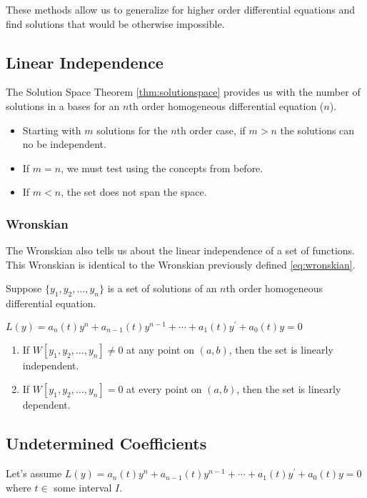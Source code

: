 \documentclass[12pt,landscape,twocolumn]{article}
\begin{document}
    These methods allow us to generalize for higher order differential equations and find solutions that would be otherwise impossible.

    \subsection{Linear Independence}
    The Solution Space Theorem \eqref{thm:solutionspace} provides us with the number of solutions in a bases for an $n$th order homogeneous differential equation ($n$).

    \begin{itemize}
        \item Starting with $m$ solutions for the $n$th order case, if $m > n$ the solutions can no be independent.
        \item If $m=n$, we must test using the concepts from before.
        \item If $m < n$, the set does not span the space.
    \end{itemize}

        \subsubsection{Wronskian}
        The Wronskian also tells us about the linear independence of a set of functions. This Wronskian is identical to the Wronskian previously defined \eqref{eq:wronskian}.

        Suppose $\{y_1, y_2, \dots, y_n \}$ is a set of solutions of an $n$th order homogeneous differential equation.

            $
                L(y) = a_n(t)y^n + a_{n-1}(t)y^{n-1} + \cdots + a_1 (t)y^\prime + a_0 (t)y = 0
            $
            \begin{enumerate}
                \item If $W[y_1, y_2, \dots, y_n] \neq 0$ at any point on $(a, b)$, then the set is linearly independent.
                \item If $W[y_1, y_2, \dots, y_n] = 0$ at every point on $(a, b)$, then the set is linearly dependent.
            \end{enumerate}

    \subsection{Undetermined Coefficients}\label{sec:2decoefficients}
    Let's assume
        $ L(y) = a_n(t)y^n + a_{n-1}(t)y^{n-1} + \cdots + a_1 (t)y^\prime + a_0 (t)y = 0 $
    where $t \in $ some interval $I$.
\end{document}
